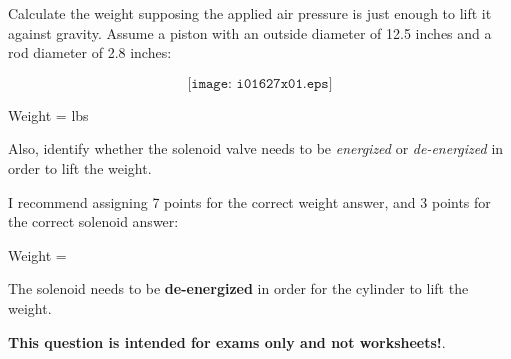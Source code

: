 

Calculate the weight supposing the applied air pressure is just enough to lift it against gravity.  Assume a piston with an outside diameter of 12.5 inches and a rod diameter of 2.8 inches:

$$\texttt{[image: i01627x01.eps]}$$

Weight = \underbar{\hskip 50pt} lbs

\vskip 10pt

Also, identify whether the solenoid valve needs to be {\it energized} or {\it de-energized} in order to lift the weight.







I recommend assigning 7 points for the correct weight answer, and 3 points for the correct solenoid answer:

\vskip 10pt

Weight = 

\vskip 10pt

The solenoid needs to be {\bf de-energized} in order for the cylinder to lift the weight.







{\bf This question is intended for exams only and not worksheets!}.



